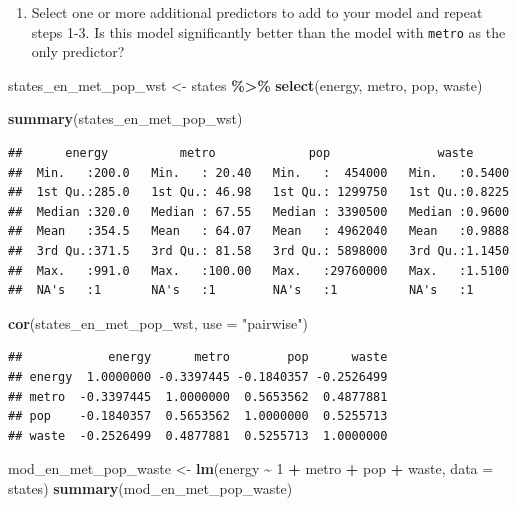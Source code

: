 \documentclass[
]{book}
\newenvironment{Shaded}{\begin{snugshade}}{\end{snugshade}}
\newcommand{\DataTypeTok}[1]{\textcolor[rgb]{0.13,0.29,0.53}{#1}}
\newcommand{\DecValTok}[1]{\textcolor[rgb]{0.00,0.00,0.81}{#1}}
\newcommand{\KeywordTok}[1]{\textcolor[rgb]{0.13,0.29,0.53}{\textbf{#1}}}
\newcommand{\NormalTok}[1]{#1}
\newcommand{\OperatorTok}[1]{\textcolor[rgb]{0.81,0.36,0.00}{\textbf{#1}}}
\newcommand{\StringTok}[1]{\textcolor[rgb]{0.31,0.60,0.02}{#1}}
\providecommand{\tightlist}{%
  \setlength{\itemsep}{0pt}\setlength{\parskip}{0pt}}
\begin{document}
\begin{enumerate}
\def\labelenumi{\arabic{enumi}.}
\setcounter{enumi}{3}
\tightlist
\item
  Select one or more additional predictors to add to your model and repeat steps 1-3. Is this model significantly better than the model with \texttt{metro} as the only predictor?
\end{enumerate}

\begin{Shaded}
\begin{Highlighting}[]
\NormalTok{  states\_en\_met\_pop\_wst \textless{}{-}}\StringTok{ }
\StringTok{      }\NormalTok{states }\OperatorTok{\%\textgreater{}\%}
\StringTok{      }\KeywordTok{select}\NormalTok{(energy, metro, pop, waste)}

  \KeywordTok{summary}\NormalTok{(states\_en\_met\_pop\_wst)}
\end{Highlighting}
\end{Shaded}

\begin{verbatim}
##      energy          metro             pop               waste       
##  Min.   :200.0   Min.   : 20.40   Min.   :  454000   Min.   :0.5400  
##  1st Qu.:285.0   1st Qu.: 46.98   1st Qu.: 1299750   1st Qu.:0.8225  
##  Median :320.0   Median : 67.55   Median : 3390500   Median :0.9600  
##  Mean   :354.5   Mean   : 64.07   Mean   : 4962040   Mean   :0.9888  
##  3rd Qu.:371.5   3rd Qu.: 81.58   3rd Qu.: 5898000   3rd Qu.:1.1450  
##  Max.   :991.0   Max.   :100.00   Max.   :29760000   Max.   :1.5100  
##  NA's   :1       NA's   :1        NA's   :1          NA's   :1
\end{verbatim}

\begin{Shaded}
\begin{Highlighting}[]
  \KeywordTok{cor}\NormalTok{(states\_en\_met\_pop\_wst, }\DataTypeTok{use =} \StringTok{"pairwise"}\NormalTok{)}
\end{Highlighting}
\end{Shaded}

\begin{verbatim}
##            energy      metro        pop      waste
## energy  1.0000000 -0.3397445 -0.1840357 -0.2526499
## metro  -0.3397445  1.0000000  0.5653562  0.4877881
## pop    -0.1840357  0.5653562  1.0000000  0.5255713
## waste  -0.2526499  0.4877881  0.5255713  1.0000000
\end{verbatim}

\begin{Shaded}
\begin{Highlighting}[]
\NormalTok{  mod\_en\_met\_pop\_waste \textless{}{-}}\StringTok{ }\KeywordTok{lm}\NormalTok{(energy }\OperatorTok{\textasciitilde{}}\StringTok{ }\DecValTok{1} \OperatorTok{+}\StringTok{ }\NormalTok{metro }\OperatorTok{+}\StringTok{ }\NormalTok{pop }\OperatorTok{+}\StringTok{ }\NormalTok{waste, }\DataTypeTok{data =}\NormalTok{ states)}
  \KeywordTok{summary}\NormalTok{(mod\_en\_met\_pop\_waste)}
\end{Highlighting}
\end{Shaded}
\end{document}
